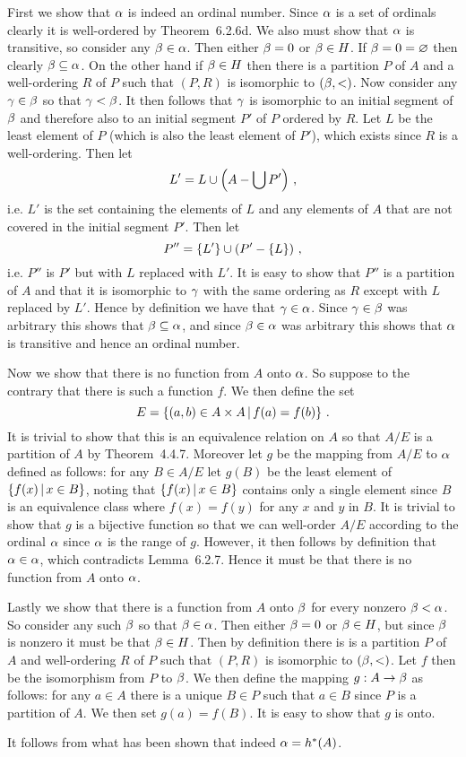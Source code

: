 {{    First we show that $\alpha$ is indeed an ordinal number.
    Since $\alpha$ is a set of ordinals clearly it is well-ordered by Theorem~6.2.6d.
    We also must show that $\alpha$ is transitive, so consider any $\beta \in \alpha$.
    Then either $\beta = 0$ or $\beta \in H$.
    If $\beta = 0 = \varnothing$ then clearly $\beta \subseteq \alpha$.
    On the other hand if $\beta \in H$ then there is a partition $P$ of $A$ and a well-ordering $R$ of $P$ such that $(P, R)$ is isomorphic to $(\beta, <)$.
    Now consider any $\gamma \in \beta$ so that $\gamma < \beta$.
    It then follows that $\gamma$ is isomorphic to an initial segment of $\beta$ and therefore also to an initial segment $P'$ of $P$ ordered by $R$.
    Let $L$ be the least element of $P$ (which is also the least element of $P'$), which exists since $R$ is a well-ordering.
    Then let
    $$
    L' = L \cup \left( A - \bigcup P' \right) \,,
    $$
    i.e. $L'$ is the set containing the elements of $L$ and any elements of $A$ that are not covered in the initial segment $P'$.
    Then let
    $$
    P'' = \left\{ L' \right\} \cup \left( P' - \left\{ L \right\} \right) \,,
    $$
    i.e. $P''$ is $P'$ but with $L$ replaced with $L'$.
    It is easy to show that $P''$ is a partition of $A$ and that it is isomorphic to $\gamma$ with the same ordering as $R$ except with $L$ replaced by $L'$.
    Hence by definition we have that $\gamma \in \alpha$.
    Since $\gamma \in \beta$ was arbitrary this shows that $\beta \subseteq \alpha$, and since $\beta \in \alpha$ was arbitrary this shows that $\alpha$ is transitive and hence an ordinal number.

    Now we show that there is no function from $A$ onto $\alpha$.
    So suppose to the contrary that there is such a function $f$.
    We then define the set
    $$
    E = \left\{ (a,b) \in A \times A \,|\, f(a) = f(b) \right\} \,.
    $$
    It is trivial to show that this is an equivalence relation on $A$ so that $A/E$ is a partition of $A$ by Theorem~4.4.7.
    Moreover let $g$ be the mapping from $A/E$ to $\alpha$ defined as follows: for any $B \in A/E$ let $g(B)$ be the least element of $\left\{ f(x) \,|\, x \in B \right\}$, noting that $\left\{ f(x) \,|\, x \in B \right\}$ contains only a single element since $B$ is an equivalence class where $f(x) = f(y)$ for any $x$ and $y$ in $B$.
    It is trivial to show that $g$ is a bijective function so that we can well-order $A/E$ according to the ordinal $\alpha$ since $\alpha$ is the range of $g$.
    However, it then follows by definition that $\alpha \in \alpha$, which contradicts Lemma~6.2.7.
    Hence it must be that there is no function from $A$ onto $\alpha$.

    Lastly we show that there is a function from $A$ onto $\beta$ for every nonzero $\beta < \alpha$.
    So consider any such $\beta$ so that $\beta \in \alpha$.
    Then either $\beta = 0$ or $\beta \in H$, but since $\beta$ is nonzero it must be that $\beta \in H$.
    Then by definition there is is a partition $P$ of $A$ and well-ordering $R$ of $P$ such that $(P,R)$ is isomorphic to $(\beta,<)$.
    Let $f$ then be the isomorphism from $P$ to $\beta$.
    We then define the mapping $g : A \to \beta$ as follows: for any $a \in A$ there is a unique $B \in P$ such that $a \in B$ since $P$ is a partition of $A$.
    We then set $g(a) = f(B)$.
    It is easy to show that $g$ is onto.

    It follows from what has been shown that indeed $\alpha = h^*(A)$.
  }
}
